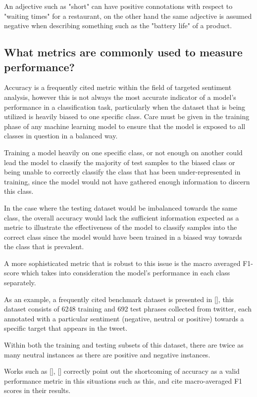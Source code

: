 \documentclass[12pt, a4paper]{report}
\theoremstyle{definition}
\theoremstyle{definition}%
\theoremstyle{definition}%
\theoremstyle{definition}%
\theoremstyle{definition}%
\theoremstyle{definition}%
\renewcommand{\cite}[1]{[\citealp{#1}]}
\begin{document}
An adjective such as "short" can have positive connotations with respect to "waiting times" for a restaurant, on the other hand the same adjective is assumed negative when describing something such as the "battery life" of a product. 

\subsection{What metrics are commonly used to measure performance?}
Accuracy is a frequently cited metric within the field of targeted sentiment analysis, however this is not always the most accurate indicator of a model's performance in a classification task, particularly when the dataset that is being utilized is heavily biased to one specific class. 
Care must be given in the training phase of any machine learning model to ensure that the model is exposed to all classes in question in a balanced way. 

Training a model heavily on one specific class, or not enough on another could lead the model to classify the majority of test samples to the biased class or being unable to correctly classify the class that has been under-represented in training, since the model would not have gathered enough information to discern this class. 

In the case where the testing dataset would be imbalanced towards the same class, the overall accuracy would lack the sufficient information expected as a metric to illustrate the effectiveness of the model to classify samples into the correct class since the model would have been trained in a biased way towards the class that is prevalent. 

A more sophisticated metric that is robust to this issue is the macro averaged F1-score which takes into consideration the model's performance in each class separately. 

As an example, a frequently cited benchmark dataset is presented in \cite{dong}, this dataset consists of 6248 training and 692 test phrases collected from twitter, each annotated with a particular sentiment (negative, neutral or positive) towards a specific target that appears in the tweet. 

Within both the training and testing subsets of this dataset, there are twice as many neutral instances as there are positive and negative instances. 

Works such as \cite{chen2017}, \cite{dong} correctly point out the shortcoming of accuracy as a valid performance metric in this situations such as this, and cite macro-averaged F1 scores in their results. 
\end{document}
